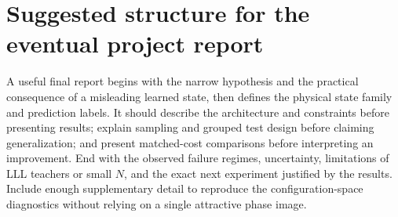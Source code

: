 \documentclass[11pt,letterpaper]{article}
\begin{document}
\section{Suggested structure for the eventual project report}

A useful final report begins with the narrow hypothesis and the practical consequence of a misleading learned state, then defines the physical state family and prediction labels. It should describe the architecture and constraints before presenting results; explain sampling and grouped test design before claiming generalization; and present matched-cost comparisons before interpreting an improvement. End with the observed failure regimes, uncertainty, limitations of LLL teachers or small $N$, and the exact next experiment justified by the results. Include enough supplementary detail to reproduce the configuration-space diagnostics without relying on a single attractive phase image.
\end{document}
